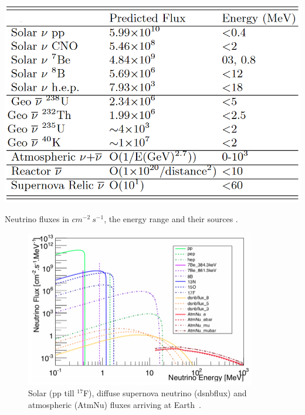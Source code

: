 \documentclass{article}
\begin{document}
\begin{table}[h!]
    \centering
    \includegraphics[width=.8\textwidth]{Neutrino_fluxes.PNG}
    \caption{Neutrino fluxes in $cm^{-2}\ s^{-1}$, the energy range and their sources \cite{Monroe:2007xp}.}
    \label{tab:neutrino_flux}
\end{table}

\begin{figure}[h!]
    \centering
    \includegraphics[width = 0.9\textwidth]{Plot_neutrino_flux.png}
    \caption{Solar (pp till ${}^{17}$F), diffuse supernova neutrino (dsnbflux) and atmospheric (AtmNu) fluxes arriving at Earth~\cite{Billard:2013qya}.}
    \label{fig:neutrino_flux}
\end{figure}
\end{document}
